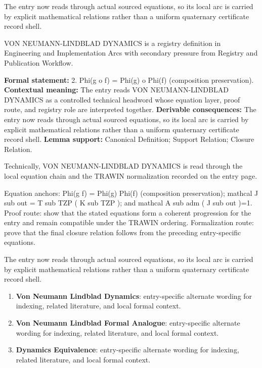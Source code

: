 The entry now reads through actual sourced equations, so its local arc is carried by explicit mathematical relations rather than a uniform quaternary certificate record shell.
\clearpage


\begingroup\small
{}
VON NEUMANN-LINDBLAD DYNAMICS is a registry definition in Engineering and Implementation Arcs with secondary pressure from Registry and Publication Workflow.

\begingroup\footnotesize\setlength{\emergencystretch}{3em}\sloppy
\textbf{Formal statement:} 2. Phi(g o f) = Phi(g) o Phi(f) (composition preservation). \textbf{Contextual meaning:} The entry reads VON NEUMANN-LINDBLAD DYNAMICS as a controlled technical headword whose equation layer, proof route, and registry role are interpreted together. \textbf{Derivable consequences:} The entry now reads through actual sourced equations, so its local arc is carried by explicit mathematical relations rather than a uniform quaternary certificate record shell. \textbf{Lemma support:} Canonical Definition; Support Relation; Closure Relation.\par
\endgroup

Technically, VON NEUMANN-LINDBLAD DYNAMICS is read through the local equation chain and the TRAWIN normalization recorded on the entry page.

Equation anchors: Phi(g   f) = Phi(g)   Phi(f) (composition preservation); mathcal J sub out = T sub TZP ( K sub TZP ); and mathcal A sub adm ( J sub out )=1. Proof route: show that the stated equations form a coherent progression for the entry and remain compatible under the TRAWIN ordering. Formalization route: prove that the final closure relation follows from the preceding entry-specific equations.

The entry now reads through actual sourced equations, so its local arc is carried by explicit mathematical relations rather than a uniform quaternary certificate record shell.
\endgroup

\begin{enumerate}[leftmargin=1.6em,itemsep=6pt,topsep=4pt]
\item \textbf{Von Neumann Lindblad Dynamics}: entry-specific alternate wording for indexing, related literature, and local formal context.
\item \textbf{Von Neumann Lindblad Formal Analogue}: entry-specific alternate wording for indexing, related literature, and local formal context.
\item \textbf{Dynamics Equivalence}: entry-specific alternate wording for indexing, related literature, and local formal context.
\end{enumerate}

